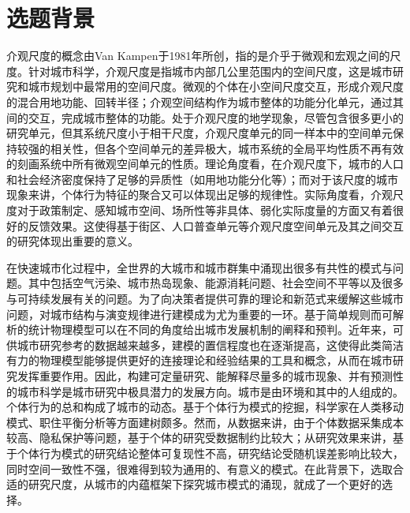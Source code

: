 \chapter{选题背景}
\setcounter{page}{1}




介观尺度的概念由Van Kampen于1981年所创，指的是介乎于微观和宏观之间的尺度。针对城市科学，介观尺度是指城市内部几公里范围内的空间尺度，这是城市研究和城市规划中最常用的空间尺度。微观的个体在小空间尺度交互，形成介观尺度的混合用地功能、回转半径；介观空间结构作为城市整体的功能分化单元，通过其间的交互，完成城市整体的功能。处于介观尺度的地学现象，尽管包含很多更小的研究单元，但其系统尺度小于相干尺度，介观尺度单元的同一样本中的空间单元保持较强的相关性，但各个空间单元的差异极大，城市系统的全局平均性质不再有效的刻画系统中所有微观空间单元的性质。理论角度看，在介观尺度下，城市的人口和社会经济密度保持了足够的异质性（如用地功能分化等）；而对于该尺度的城市现象来讲，个体行为特征的聚合又可以体现出足够的规律性。实际角度看，介观尺度对于政策制定、感知城市空间、场所性等非具体、弱化实际度量的方面又有着很好的反馈效果。这使得基于街区、人口普查单元等介观尺度空间单元及其之间交互的研究体现出重要的意义。

在快速城市化过程中，全世界的大城市和城市群集中涌现出很多有共性的模式与问题。其中包括空气污染、城市热岛现象、能源消耗问题、社会空间不平等以及很多与可持续发展有关的问题。为了向决策者提供可靠的理论和新范式来缓解这些城市问题，对城市结构与演变规律进行建模成为尤为重要的一环。基于简单规则而可解析的统计物理模型可以在不同的角度给出城市发展机制的阐释和预判。近年来，可供城市研究参考的数据越来越多，建模的置信程度也在逐渐提高，这使得此类简洁有力的物理模型能够提供更好的连接理论和经验结果的工具和概念，从而在城市研究发挥重要作用。因此，构建可定量研究、能解释尽量多的城市现象、并有预测性的城市科学是城市研究中极具潜力的发展方向。城市是由环境和其中的人组成的。个体行为的总和构成了城市的动态。基于个体行为模式的挖掘，科学家在人类移动模式、职住平衡分析等方面建树颇多。然而，从数据来讲，由于个体数据采集成本较高、隐私保护等问题，基于个体的研究受数据制约比较大；从研究效果来讲，基于个体行为模式的研究结论整体可复现性不高，研究结论受随机误差影响比较大，同时空间一致性不强，很难得到较为通用的、有意义的模式。在此背景下，选取合适的研究尺度，从城市的内蕴框架下探究城市模式的涌现，就成了一个更好的选择。

